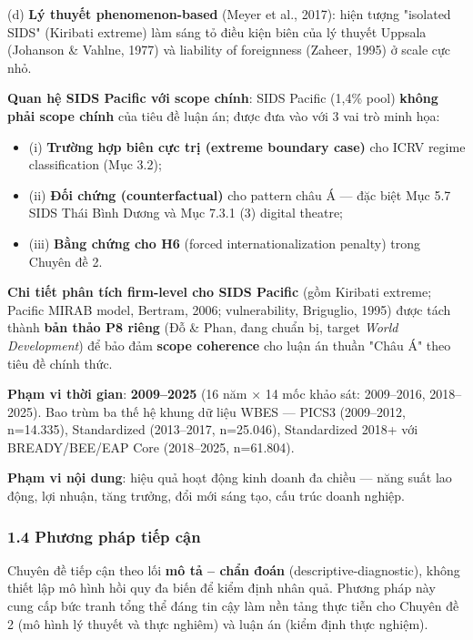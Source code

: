 \documentclass[12pt,a4paper]{article}
\providecommand{\tightlist}{\setlength{\itemsep}{0pt}\setlength{\parskip}{0pt}}
\begin{document}
(d) \textbf{Lý thuyết phenomenon-based} (Meyer et al., 2017): hiện tượng
"isolated SIDS" (Kiribati extreme) làm sáng tỏ điều kiện biên của lý
thuyết Uppsala (Johanson \& Vahlne, 1977) và liability of foreignness
(Zaheer, 1995) ở scale cực nhỏ.

\textbf{Quan hệ SIDS Pacific với scope chính}: SIDS Pacific (1,4\% pool)
\textbf{không phải scope chính} của tiêu đề luận án; được đưa vào với 3
vai trò minh họa:

\begin{itemize}
\tightlist
\item
  (i) \textbf{Trường hợp biên cực trị (extreme boundary case)} cho ICRV
  regime classification (Mục 3.2);
\item
  (ii) \textbf{Đối chứng (counterfactual)} cho pattern châu Á --- đặc
  biệt Mục 5.7 SIDS Thái Bình Dương và Mục 7.3.1 (3) digital theatre;
\item
  (iii) \textbf{Bằng chứng cho H6} (forced internationalization penalty)
  trong Chuyên đề 2.
\end{itemize}

\textbf{Chi tiết phân tích firm-level cho SIDS Pacific} (gồm Kiribati
extreme; Pacific MIRAB model, Bertram, 2006; vulnerability, Briguglio,
1995) được tách thành \textbf{bản thảo P8 riêng} (Đỗ \& Phan, đang chuẩn
bị, target \emph{World Development}) để bảo đảm \textbf{scope coherence}
cho luận án thuần "Châu Á" theo tiêu đề chính thức.

\textbf{Phạm vi thời gian}: \textbf{2009--2025} (16 năm × 14 mốc khảo
sát: 2009--2016, 2018--2025). Bao trùm ba thế hệ khung dữ liệu WBES ---
PICS3 (2009--2012, n=14.335), Standardized (2013--2017, n=25.046),
Standardized 2018+ với BREADY/BEE/EAP Core (2018--2025, n=61.804).

\textbf{Phạm vi nội dung}: hiệu quả hoạt động kinh doanh đa chiều ---
năng suất lao động, lợi nhuận, tăng trưởng, đổi mới sáng tạo, cấu trúc
doanh nghiệp.

\hypertarget{14-phux1b0ux1a1ng-phuxe1p-tiux1ebfp-cux1eadn}{%
\subsubsection{1.4 Phương pháp tiếp
cận}\label{14-phux1b0ux1a1ng-phuxe1p-tiux1ebfp-cux1eadn}}

Chuyên đề tiếp cận theo lối \textbf{mô tả -- chẩn đoán}
(descriptive-diagnostic), không thiết lập mô hình hồi quy đa biến để
kiểm định nhân quả. Phương pháp này cung cấp bức tranh tổng thể đáng tin
cậy làm nền tảng thực tiễn cho Chuyên đề 2 (mô hình lý thuyết và thực
nghiêm) và luận án (kiểm định thực nghiệm).
\end{document}

